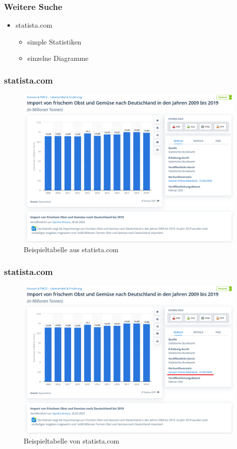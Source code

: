 \documentclass{beamer}
\begin{document}
\begin{frame}
	\frametitle{Weitere Suche}
	\begin{itemize}
		\item statista.com
			\begin{itemize}
				\item simple Statistiken
				\item einzelne Diagramme
			\end{itemize}
	\end{itemize}
\end{frame}

\begin{frame}
	\frametitle{statista.com}
	\begin{figure}[h]
		\caption{Beispieltabelle aus statista.com}
		\centering
		\includegraphics[scale=0.3]{5_Destatis_Report}
	\end{figure}
\end{frame}

\begin{frame}
	\frametitle{statista.com}
	\begin{figure}[h]
		\caption{Beispieltabelle von statista.com}
		\centering
		\includegraphics[scale=0.25]{5_Destatis_Report_highlightet}
	\end{figure}
\end{frame}  
\end{document}

